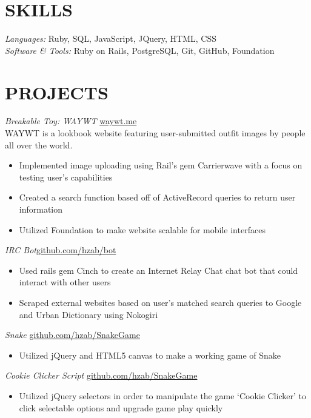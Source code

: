 \documentclass[margin]{res}
\begin{document}
\begin{resume}
 
 
\section{SKILLS} {\sl Languages:} Ruby, SQL, JavaScript, JQuery, HTML, CSS \\
	       {\sl Software \& Tools:} Ruby on Rails, PostgreSQL, Git, GitHub, Foundation \\

\section{PROJECTS} {\sl Breakable Toy: WAYWT } \hfill \href{http://www.waywt.me}{waywt.me} \\
                WAYWT is a lookbook website featuring user-submitted outfit images by people all over the world.
                 \begin{itemize}  \itemsep -2pt %
                 \item Implemented image uploading using Rail’s gem Carrierwave with a focus on testing user’s capabilities
                \item Created a search function based off of ActiveRecord queries to return user information
		\item Utilized Foundation to make website scalable for mobile interfaces
                \end{itemize}

 		{\sl IRC Bot}\hfill \href{https://github.com/hzab/bot}{github.com/hzab/bot} 
                 \begin{itemize}  \itemsep -2pt %
                 \item Used rails gem Cinch to create an Internet Relay Chat chat bot that could interact with other users
                \item Scraped external websites based on user’s matched search queries to Google and Urban Dictionary using Nokogiri
		\end{itemize}

 
                {\sl Snake} \hfill            \href{https://github.com/hzab/SnakeGame}{github.com/hzab/SnakeGame}
                 \begin{itemize}  \itemsep -2pt %
                 \item Utilized jQuery and HTML5 canvas to make a working game of Snake
                 \end{itemize}
                 {\sl Cookie Clicker Script} \hfill            \href{https://github.com/hzab/SnakeGame}{github.com/hzab/SnakeGame}
                 \begin{itemize}  \itemsep -2pt %
                 \item Utilized jQuery selectors in order to manipulate the game ‘Cookie Clicker’ to click selectable options and upgrade game play quickly
                 \end{itemize}


\end{resume}
\end{document}
